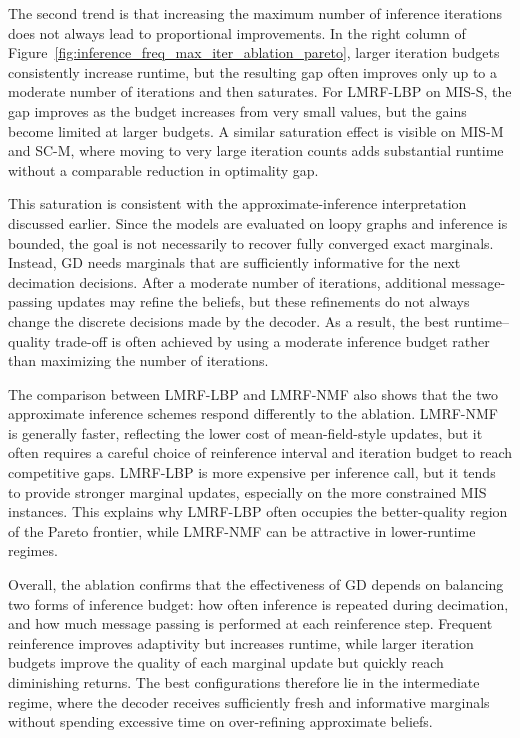 

The second trend is that increasing the maximum number of inference iterations does not always lead to proportional improvements. In the right column of Figure~\ref{fig:inference_freq_max_iter_ablation_pareto}, larger iteration budgets consistently increase runtime, but the resulting gap often improves only up to a moderate number of iterations and then saturates. For LMRF-LBP on MIS-S, the gap improves as the budget increases from very small values, but the gains become limited at larger budgets. A similar saturation effect is visible on MIS-M and SC-M, where moving to very large iteration counts adds substantial runtime without a comparable reduction in optimality gap.

This saturation is consistent with the approximate-inference interpretation discussed earlier. Since the models are evaluated on loopy graphs and inference is bounded, the goal is not necessarily to recover fully converged exact marginals. Instead, GD needs marginals that are sufficiently informative for the next decimation decisions. After a moderate number of iterations, additional message-passing updates may refine the beliefs, but these refinements do not always change the discrete decisions made by the decoder. As a result, the best runtime--quality trade-off is often achieved by using a moderate inference budget rather than maximizing the number of iterations.

The comparison between LMRF-LBP and LMRF-NMF also shows that the two approximate inference schemes respond differently to the ablation. LMRF-NMF is generally faster, reflecting the lower cost of mean-field-style updates, but it often requires a careful choice of reinference interval and iteration budget to reach competitive gaps. LMRF-LBP is more expensive per inference call, but it tends to provide stronger marginal updates, especially on the more constrained MIS instances. This explains why LMRF-LBP often occupies the better-quality region of the Pareto frontier, while LMRF-NMF can be attractive in lower-runtime regimes.

Overall, the ablation confirms that the effectiveness of GD depends on balancing two forms of inference budget: how often inference is repeated during decimation, and how much message passing is performed at each reinference step. Frequent reinference improves adaptivity but increases runtime, while larger iteration budgets improve the quality of each marginal update but quickly reach diminishing returns. The best configurations therefore lie in the intermediate regime, where the decoder receives sufficiently fresh and informative marginals without spending excessive time on over-refining approximate beliefs.

